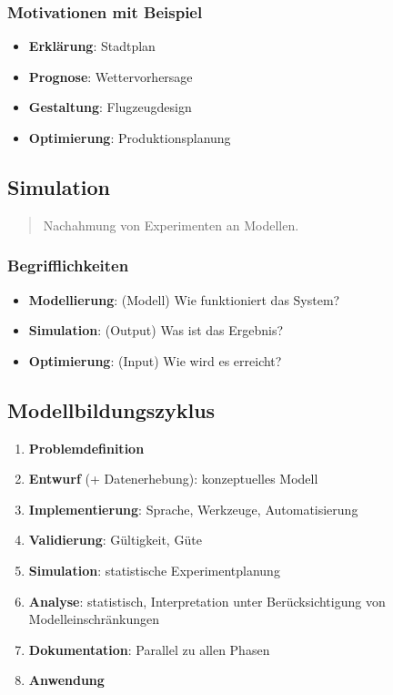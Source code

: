 \documentclass{article}
\begin{document}
\subsubsection{Motivationen mit Beispiel}
\begin{itemize}
  \item \textbf{Erklärung}: Stadtplan
  \item \textbf{Prognose}: Wettervorhersage
  \item \textbf{Gestaltung}: Flugzeugdesign
  \item \textbf{Optimierung}: Produktionsplanung
\end{itemize}

\subsection{Simulation}
\begin{quote}Nachahmung von Experimenten an Modellen.\end{quote}



\subsubsection{Begrifflichkeiten}
\begin{itemize}
  \item \textbf{Modellierung}: (Modell) Wie funktioniert das System?
  \item \textbf{Simulation}: (Output) Was ist das Ergebnis?
  \item \textbf{Optimierung}: (Input) Wie wird es erreicht?
\end{itemize}

\subsection{Modellbildungszyklus}
\begin{enumerate}
  \item \textbf{Problemdefinition}
  \item \textbf{Entwurf} (+ Datenerhebung): konzeptuelles Modell
  \item \textbf{Implementierung}: Sprache, Werkzeuge, Automatisierung
  \item \textbf{Validierung}: Gültigkeit, Güte
  \item \textbf{Simulation}: statistische Experimentplanung
  \item \textbf{Analyse}: statistisch, Interpretation unter Berücksichtigung von Modelleinschränkungen
  \item \textbf{Dokumentation}: Parallel zu allen Phasen
  \item \textbf{Anwendung}
\end{enumerate}
\end{document}
